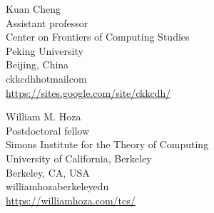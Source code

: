 \documentclass{toc}
\begin{document}

%
%
%
%


%
%
%
%
%
\begin{tocauthors}
\begin{tocinfo}[cheng]
Kuan Cheng\\
Assistant professor\\
Center on Frontiers of Computing Studies\\
Peking University\\
Beijing, China\\
ckkcdh\tocat{}hotmail\tocdot{}com \\
\url{https://sites.google.com/site/ckkcdh/}
\end{tocinfo}
\begin{tocinfo}[hoza]
William M. Hoza\\
Postdoctoral fellow\\
Simons Institute for the Theory of Computing\\
University of California, Berkeley\\
Berkeley, CA, USA\\
williamhoza\tocat{}berkeley\tocdot{}edu \\   %
\url{https://williamhoza.com/tcs/}      %
\end{tocinfo}
\end{tocauthors}
\end{document}
